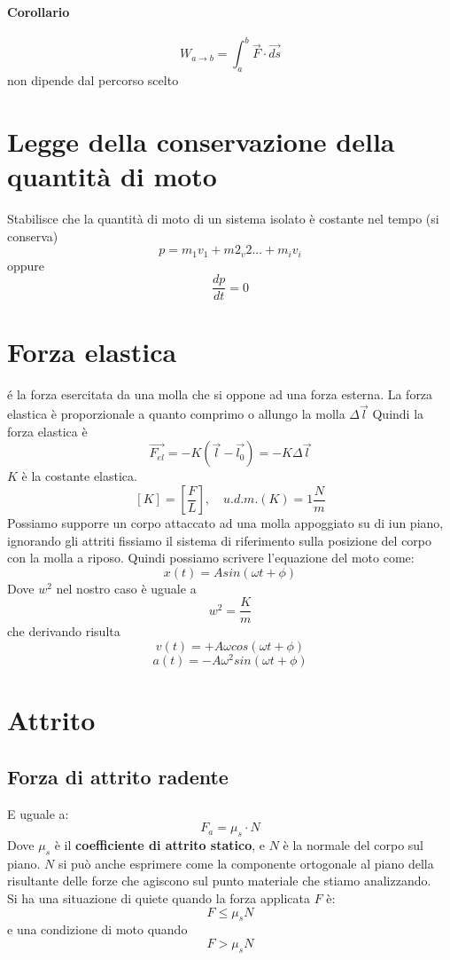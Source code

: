 \documentclass[a4paper]{report}
\begin{document}
  \paragraph{Corollario}
  $$ W_{a \rightarrow b} = \int_a^b \vec{F}\cdot \vec{ds} $$
  non dipende dal percorso scelto

  \section{Legge della conservazione della quantità di moto}
  Stabilisce che la quantità di moto di un sistema isolato è costante nel tempo (si conserva)
  $$ p = m_1v_1 + m2_v2 ... + m_iv_i $$
  oppure
  $$ \frac{dp}{dt} = 0 $$

  \section{Forza elastica}
  é la forza esercitata da una molla che si oppone ad una forza esterna. La forza elastica è proporzionale a quanto comprimo o allungo la molla $\Delta \vec{l}$
  Quindi la forza elastica è
  $$ \vec{F_{el}} = -K(\vec{l} - \vec{l_0}) = -K \Delta \vec{l} $$
  $K$ è la costante elastica.
  $$[K] = [\frac{F}{L}], \quad u.d.m.(K) = 1 \frac{N}{m}$$
  Possiamo supporre un corpo attaccato ad una molla appoggiato su di iun piano, ignorando gli attriti fissiamo il sistema di riferimento sulla posizione del corpo con la molla a riposo. Quindi possiamo scrivere l'equazione del moto come:
  $$x(t) = A sin(\omega t + \phi)$$
  Dove $w^2$ nel nostro caso è uguale a
  $$ w^2 = \frac{K}{m} $$
  che derivando risulta
  $$ v(t) = + A \omega cos(\omega t + \phi) $$
  $$ a(t) = -A \omega^2 sin (\omega t + \phi) $$

  \section{Attrito}
  \subsection{Forza di attrito radente}
  E uguale a:
  $$ F_a = \mu_s \cdot N$$
  Dove $\mu_s$ è il \textbf{coefficiente di attrito statico}, e $N$ è la normale del corpo sul piano. $N$ si può anche esprimere come la componente ortogonale al piano della risultante delle forze che agiscono sul punto materiale che stiamo analizzando.
  \\Si ha una situazione di quiete quando la forza applicata $F$ è:
  $$ F \leq \mu_s N $$
  e una condizione di moto quando
  $$ F > \mu_s N $$
\end{document}
